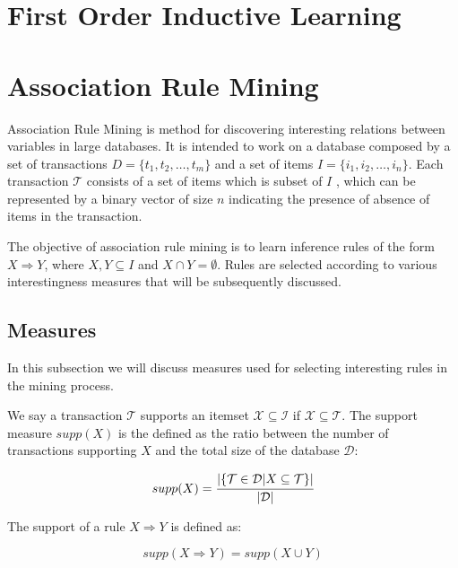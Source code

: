 \section{First Order Inductive Learning}
\cite{DBLP:journals/ml/Quinlan9}
\cite{DBLP:conf/ecml/QuinlanC93}

\section{Association Rule Mining}
\cite{Agrawal:1993:MAR:170036.170072}
\cite{Hipp00algorithmsfor}

Association Rule Mining is method for discovering interesting relations between variables in large databases. It is
intended to work on a database composed by a set of transactions $D=\{t_1,t_2,\ldots,t_m\}$ and a set of items
$I=\{i_1,i_2,\ldots,i_n\}$. Each transaction $\mathcal{T}$ consists of a set of items which is subset of $I$ , which can
be represented by a binary vector of size $n$ indicating the presence of absence of items in the transaction.

The objective of association rule mining is to learn inference rules of the form $X \Rightarrow Y$, where $X,Y
\subseteq I$ and $X \cap Y = \emptyset$. Rules are selected according to various interestingness measures that will be
subsequently discussed.

\subsection{Measures}

In this subsection we will discuss measures used for selecting interesting rules in the mining process.

We say a transaction $\mathcal{T}$ supports an itemset $\mathcal{X} \subseteq \mathcal{I}$ if $\mathcal{X} \subseteq
\mathcal{T}$. The support measure $supp(X)$ is the defined as the ratio between the number of transactions supporting
$X$ and the total size of the database $\mathcal{D}$:

\begin{equation}
 supp(X)=\cfrac{|\{ \mathcal{T} \in \mathcal{D} | X \subseteq \mathcal{T} \}|}{|\mathcal{D}|}
\end{equation}

The support of a rule $X \Rightarrow Y$ is defined as:

\begin{equation}
 supp(X \Rightarrow Y)=supp(X \cup Y)
\end{equation}

